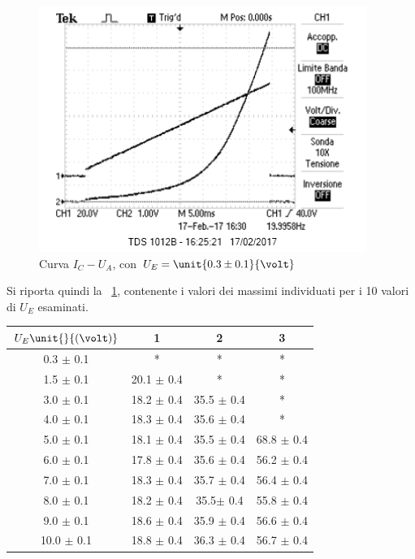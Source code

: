 \documentclass[10pt,a4paper]{article}
\begin{document}
\begin{figure}[H]
\begin{minipage}{0.55\textwidth}
		\includegraphics[width=0.95\textwidth]{../oscilloscopio/Task9_0.png}
		\caption{Curva $I_{C} - U_{A}$, con $U_E = \unit{0.3 \pm 0.1}{\volt}$}
		\label{fig:UEex3}
	\end{minipage}
\end{figure}

Si riporta quindi la \tablename{~\ref{tab:maxfit}}, contenente i valori dei massimi individuati per i 10 valori di $U_E$ esaminati.

\begin{table}[h!]
	\centering
	\begin{tabular}{c|c|c|c}
		\hline
		$U_E \unit{}{(\volt)}$ & 1 & 2 & 3 \\
		\hline 
		0.3 $\pm$ 0.1 & * & * & * \\
		1.5 $\pm$ 0.1 & 20.1 $\pm$ 0.4  & * & *  \\
		3.0 $\pm$ 0.1 & 18.2 $\pm$ 0.4 & 35.5 $\pm$ 0.4 & *  \\
		4.0 $\pm$ 0.1 & 18.3  $\pm$ 0.4 & 35.6 $\pm$ 0.4 & *  \\
		5.0 $\pm$ 0.1 & 18.1  $\pm$ 0.4 & 35.5 $\pm$ 0.4 & 68.8 $\pm$ 0.4 \\
		6.0 $\pm$ 0.1 & 17.8   $\pm$ 0.4 & 35.6 $\pm$ 0.4 & 56.2 $\pm$ 0.4\\
		7.0 $\pm$ 0.1 &18.3 $\pm$ 0.4 & 35.7 $\pm$ 0.4 & 56.4 $\pm$ 0.4 \\
		8.0 $\pm$ 0.1 & 18.2 $\pm$ 0.4 & 35.5$\pm$ 0.4 & 55.8 $\pm$ 0.4 \\
		9.0 $\pm$ 0.1 & 18.6 $\pm$  0.4 & 35.9 $\pm$ 0.4 & 56.6 $\pm$ 0.4 \\
		10.0 $\pm$ 0.1 & 18.8 $\pm$ 0.4 & 36.3 $\pm$ 0.4 & 56.7 $\pm$ 0.4 \\
		\hline
	\end{tabular}
	\label{tab:maxfit}
\end{table}
\end{document}
